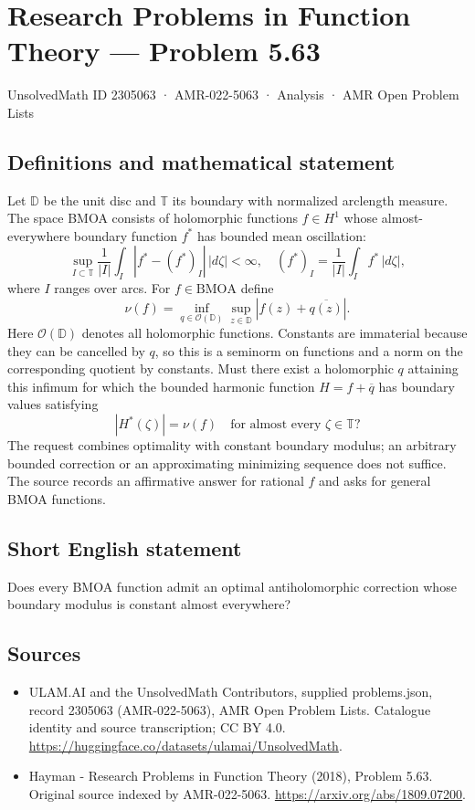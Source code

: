 \documentclass[11pt,a4paper]{article}
\begin{document}
\section*{Research Problems in Function Theory — Problem 5.63}\label{2305063}
{\small UnsolvedMath ID 2305063 · AMR-022-5063 · Analysis · AMR Open Problem Lists}
\subsection{Definitions and mathematical statement}
Let $\mathbb D$ be the unit disc and $\mathbb T$ its boundary with normalized arclength measure. The space BMOA consists of holomorphic functions $f\in H^1$ whose almost-everywhere boundary function $f^*$ has bounded mean oscillation:
\[
\sup_{I\subset\mathbb T}\frac1{|I|}\int_I|f^*-(f^*)_I|\,|d\zeta|<\infty,
\quad (f^*)_I=\frac1{|I|}\int_I f^*\,|d\zeta|,
\]
where $I$ ranges over arcs. For $f\in\mathrm{BMOA}$ define
\[
\nu(f)=\inf_{q\in\mathcal O(\mathbb D)}
\sup_{z\in\mathbb D}|f(z)+\overline{q(z)}|.
\]
Here $\mathcal O(\mathbb D)$ denotes all holomorphic functions. Constants are immaterial because they can be cancelled by $q$, so this is a seminorm on functions and a norm on the corresponding quotient by constants.
Must there exist a holomorphic $q$ attaining this infimum for which the bounded harmonic function $H=f+\overline q$ has boundary values satisfying
\[
|H^*(\zeta)|=\nu(f)\quad\text{for almost every }\zeta\in\mathbb T?
\]
The request combines optimality with constant boundary modulus; an arbitrary bounded correction or an approximating minimizing sequence does not suffice. The source records an affirmative answer for rational $f$ and asks for general BMOA functions.
\subsection{Short English statement}
Does every BMOA function admit an optimal antiholomorphic correction whose boundary modulus is constant almost everywhere?
\subsection{Sources}
\begin{itemize}
\item[S1] ULAM.AI and the UnsolvedMath Contributors, supplied problems.json, record 2305063 (AMR-022-5063), AMR Open Problem Lists. Catalogue identity and source transcription; CC BY 4.0.
\url{https://huggingface.co/datasets/ulamai/UnsolvedMath}.
\item[S2] Hayman - Research Problems in Function Theory (2018), Problem 5.63. Original source indexed by AMR-022-5063.
\url{https://arxiv.org/abs/1809.07200}.
\end{itemize}
\end{document}
